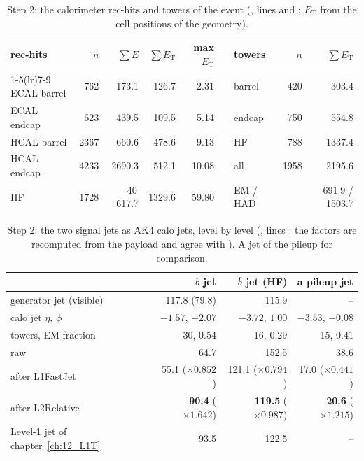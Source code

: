 \begin{table}[!htb]
\centering\small
\caption{Step 2: the calorimeter rec-hits and towers of the event (, lines  and
; $E_{\mathrm T}$ from the cell positions of the geometry).}
\label{tab:13_rechits}
\begin{tabular}{l rrrr c l rr}
\toprule
rec-hits & $n$ & $\sum E$ & $\sum E_{\mathrm T}$ & max $E_{\mathrm T}$ & & towers & $n$ & $\sum E_{\mathrm T}$ \\
\cmidrule(lr){1-5}\cmidrule(lr){7-9}
ECAL barrel & 762 & 173.1 & 126.7 & 2.31 & & barrel & 420 & 303.4 \\
ECAL endcap & 623 & 439.5 & 109.5 & 5.14 & & endcap & 750 & 554.8 \\
HCAL barrel & 2367 & 660.6 & 478.6 & 9.13 & & HF & 788 & 1337.4 \\
HCAL endcap & 4233 & 2690.3 & 512.1 & 10.08 & & all & 1958 & 2195.6 \\
HF & 1728 & 40\,617.7 & 1329.6 & 59.80 & & \quad EM / HAD & & 691.9 / 1503.7 \\
\bottomrule
\end{tabular}
\end{table}

\begin{table}[!htb]
\centering\small
\caption{Step 2: the two signal jets as AK4 calo jets, level by level (, lines ;
the factors are recomputed from the payload and agree with ). A jet of the pileup for
comparison.}
\label{tab:13_calojets}
\begin{tabular}{@{}l rrr@{}}
\toprule
 & $b$ jet & $\bar b$ jet (HF) & a pileup jet \\
\midrule
generator jet \pt{} (visible) & 117.8 (79.8) & 115.9 & -- \\
calo jet $\eta$, $\phi$ & $-1.57$, $-2.07$ & $-3.72$, $1.00$ & $-3.53$, $-0.08$ \\
towers, EM fraction & 30, 0.54 & 16, 0.29 & 15, 0.41 \\
raw \pt{} & 64.7 & 152.5 & 38.6 \\
after L1FastJet & 55.1 ($\times0.852$) & 121.1 ($\times0.794$) & 17.0 ($\times0.441$) \\
after L2Relative & \textbf{90.4} ($\times1.642$) & \textbf{119.5} ($\times0.987$) & \textbf{20.6} ($\times1.215$) \\
Level-1 jet of chapter~\ref{ch:12_L1T} & 93.5 & 122.5 & -- \\
\bottomrule
\end{tabular}
\end{table}

